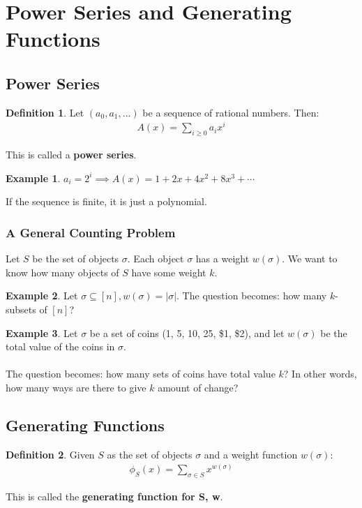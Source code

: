 \documentclass[]{article}
\theoremstyle{definition}
\newtheorem*{defn}{Definition}
\newtheorem{ex}{Example}[section]
\begin{document}
	\section{Power Series and Generating Functions}
		\subsection{Power Series}
			\begin{defn}
					Let $(a_0, a_1, \ldots)$ be a sequence of rational numbers. Then:
					\begin{align*}
						A(x) = \sum_{i \ge 0} a_i x^i
					\end{align*}

					This is called a \textbf{power series}.
			\end{defn}

			\begin{ex}
				$a_i = 2^i \implies A(x) = 1 + 2x + 4x^2 + 8x^3 + \cdots$
			\end{ex}

			If the sequence is finite, it is just a polynomial.

			\subsubsection{A General Counting Problem}
				Let $S$ be the set of objects $\sigma$. Each object $\sigma$ has a weight $w(\sigma)$. We want to know how many objects of $S$ have some weight $k$.

				\begin{ex}
					Let $\sigma \subseteq [n], w(\sigma) = |\sigma|$. The question becomes: how many $k$-subsets of $[n]$?
				\end{ex}

				\begin{ex}
					Let $\sigma$ be a set of coins (1\cent, 5\cent, 10\cent, 25\cent, \$1, \$2), and let $w(\sigma)$ be the total value of the coins in $\sigma$.
					\\ \\
					The question becomes: how many sets of coins have total value $k$? In other words, how many ways are there to give $k$ amount of change?
				\end{ex}
		\subsection{Generating Functions}
			\begin{defn}
				Given $S$ as the set of objects $\sigma$ and a weight function $w(\sigma)$:
				\begin{align*}
					\phi_S(x) = \sum_{\sigma \in S} x^{w(\sigma)}
				\end{align*}

				This is called the \textbf{generating function for S, w}.
			\end{defn}
\end{document}
